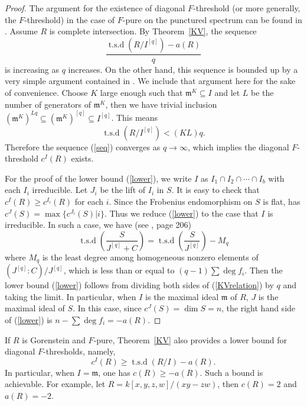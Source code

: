 \documentclass[draft]{amsart}
\theoremstyle{definition}
\numberwithin{equation}{theorem}
\begin{document}
\begin{proof}
The argument for the existence of diagonal $F$-threshold (or more generally, the $F$-threshold) in the case of $F$-pure on the punctured spectrum can be found in \cite{HTW}. Assume $R$ is complete intersection.
By Theorem~\ref{KV}, the sequence 
\begin{equation}\label{seq}
\dfrac{{\operatorname{t.s.d}} (R/I^{[q]})-a(R)}{q}
\end{equation}
is increasing as $q$ increases. On the other hand, this sequence is bounded up by a very simple argument contained in \cite{B1}. We include that argument here for the sake of convenience. Choose $K$ large enough such that ${\mathfrak{m}}^K \subseteq I$ and let $L$ be the number of generators of ${\mathfrak{m}}^K$, then we have trivial inclusion $({\mathfrak{m}}^K)^{Lq} \subseteq ({\mathfrak{m}}^K)^{[q]} \subseteq I^{[q]}$. This means $${\operatorname{t.s.d}} (R/I^{[q]}) < (KL)q.$$ Therefore the sequence (\ref{seq}) converges as $q \to {{\infty}}$, which implies 
the diagonal $F$-threshold $c^I(R)$ exists.

For the proof of the lower bound (\ref{lower}), we write $I$ as $I_1\cap I_2 \cap \cdots \cap I_b$ with each $I_i$ irreducible. Let $J_i$ be the lift of $I_i$ in $S$. It is easy to check that $c^I(R) \geq c^{I_i}(R)$ for each $i$. Since the Frobenius endomorphism on $S$ is flat,  has $c^J(S) = \max \{ c^{J_i}(S) |i\}$. Thus we reduce (\ref{lower}) to the case that $I$ is irreducible. In such a case, we have (see \cite{KV}, page 206)
\begin{equation}\label{KVrelation}
{\operatorname{t.s.d}}(\dfrac{S}{J^{[q]}+C})={\operatorname{t.s.d}}(\dfrac{S}{J^{[q]}})-M_q
\end{equation}
where $M_q$ is the least degree among homogeneous nonzero elements of $(J^{[q]}:C)/J^{[q]}$,  which is less than or equal to $(q-1)\sum \deg f_i$. Then the lower bound (\ref{lower}) follows from dividing both sides of (\ref{KVrelation}) by $q$ and taking the limit. In particular, when $I$ is the maximal ideal ${\mathfrak{m}}$ of $R$, $J$ is the maximal ideal of $S$. In this case, since $c^J(S)=\dim S =n$, the right hand side of (\ref{lower}) is $n-\sum \deg f_i=-a(R)$.
\end{proof}

If $R$ is Gorenstein and $F$-pure, Theorem~\ref{KV} also provides a lower bound for diagonal $F$-thresholds, namely,
$$
c^I(R) \geq {\operatorname{t.s.d}} (R/I)-a(R).
$$
In particular, when $I= {\mathfrak{m}}$, one has $c(R) \geq -a(R)$.
Such a bound is achievable. For example, let $R=k[x,y,z,w]/(xy-zw)$, then $c(R)=2$ and $a(R)=-2$.
\end{document}
